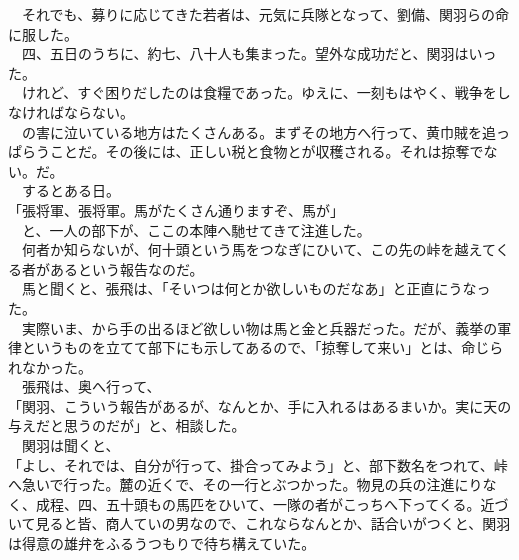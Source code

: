 \documentclass[
  paper=a5,
  fontsize=10pt,
  jafontsize=9.5pt,
  tate,                  %
  open_bracket_pos=nibu, %
]{jlreq}
\begin{document}
　それでも、募りに応じてきた若者は、元気に兵隊となって、劉備、関羽らの命に服した。\\


　四、五日のうちに、約七、八十人も集まった。望外な成功だと、関羽はいった。\\


　けれど、すぐ困りだしたのは食糧であった。ゆえに、一刻もはやく、戦争をしなければならない。\\


　の害に泣いている地方はたくさんある。まずその地方へ行って、黄巾賊を追っぱらうことだ。その後には、正しい税と食物とが収穫される。それは掠奪でない。だ。\\


　するとある日。\\


「張将軍、張将軍。馬がたくさん通りますぞ、馬が」\\


　と、一人の部下が、ここの本陣へ馳せてきて注進した。\\


　何者か知らないが、何十頭という馬をつなぎにひいて、この先の峠を越えてくる者があるという報告なのだ。\\


　馬と聞くと、張飛は、「そいつは何とか欲しいものだなあ」と正直にうなった。\\


　実際いま、から手の出るほど欲しい物は馬と金と兵器だった。だが、義挙の軍律というものを立てて部下にも示してあるので、「掠奪して来い」とは、命じられなかった。\\


　張飛は、奥へ行って、\\


「関羽、こういう報告があるが、なんとか、手に入れるはあるまいか。実に天の与えだと思うのだが」と、相談した。\\


　関羽は聞くと、\\


「よし、それでは、自分が行って、掛合ってみよう」と、部下数名をつれて、峠へ急いで行った。麓の近くで、その一行とぶつかった。物見の兵の注進にりなく、成程、四、五十頭もの馬匹をひいて、一隊の者がこっちへ下ってくる。近づいて見ると皆、商人ていの男なので、これならなんとか、話合いがつくと、関羽は得意の雄弁をふるうつもりで待ち構えていた。\\
\end{document}
